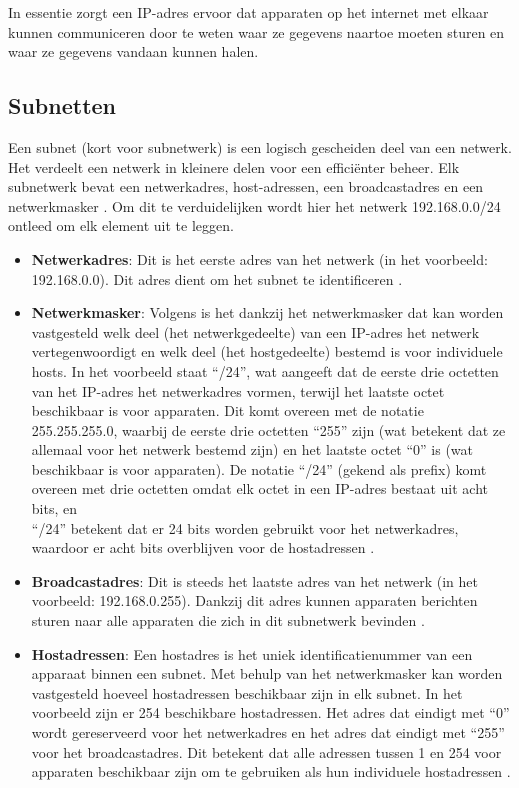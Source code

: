 In essentie zorgt een IP-adres ervoor dat apparaten op het internet met elkaar kunnen communiceren door te weten waar ze gegevens naartoe moeten sturen en waar ze gegevens vandaan kunnen halen.

\subsection{Subnetten}
Een subnet (kort voor subnetwerk) is een logisch gescheiden deel van een netwerk. Het verdeelt een netwerk in kleinere delen voor een efficiënter beheer. Elk subnetwerk bevat een netwerkadres, host-adressen, een broadcastadres en een netwerkmasker \autocite{Pummill1995}. Om dit te verduidelijken wordt hier het netwerk 192.168.0.0/24 ontleed om elk element uit te leggen.

\begin{itemize}
    \item \textbf{Netwerkadres}: Dit is het eerste adres van het netwerk (in het voorbeeld: \\192.168.0.0). Dit adres dient om het subnet te identificeren \autocite{Braden1989}.
    \item \textbf{Netwerkmasker}: Volgens \textcite{Thomas2000} is het dankzij het netwerkmasker dat kan worden vastgesteld welk deel (het netwerkgedeelte) van een IP-adres het netwerk vertegenwoordigt en welk deel (het hostgedeelte) bestemd is voor individuele hosts. In het voorbeeld staat “/24”, wat aangeeft dat de eerste drie octetten van het IP-adres het netwerkadres vormen, terwijl het laatste octet beschikbaar is voor apparaten. Dit komt overeen met de notatie 255.255.255.0, waarbij de eerste drie octetten “255” zijn (wat betekent dat ze allemaal voor het netwerk bestemd zijn) en het laatste octet “0” is (wat beschikbaar is voor apparaten). De notatie “/24” (gekend als prefix) komt overeen met drie octetten omdat elk octet in een IP-adres bestaat uit acht bits, en \\“/24” betekent dat er 24 bits worden gebruikt voor het netwerkadres, waardoor er acht bits overblijven voor de hostadressen \autocite{Thomas2000}.      
    \item \textbf{Broadcastadres}: Dit is steeds het laatste adres van het netwerk (in het voorbeeld: 192.168.0.255). Dankzij dit adres kunnen apparaten berichten sturen naar alle apparaten die zich in dit subnetwerk bevinden \autocite{Braden1989}.
    \item \textbf{Hostadressen}: Een hostadres is het uniek identificatienummer van een apparaat binnen een subnet. Met behulp van het netwerkmasker kan worden vastgesteld hoeveel hostadressen beschikbaar zijn in elk subnet. In het voorbeeld zijn er 254 beschikbare hostadressen. Het adres dat eindigt met “0” wordt gereserveerd voor het netwerkadres en het adres dat eindigt met “255” voor het broadcastadres. Dit betekent dat alle adressen tussen 1 en 254 voor apparaten beschikbaar zijn om te gebruiken als hun individuele hostadressen \autocite{Thomas2000}.
\end{itemize}

